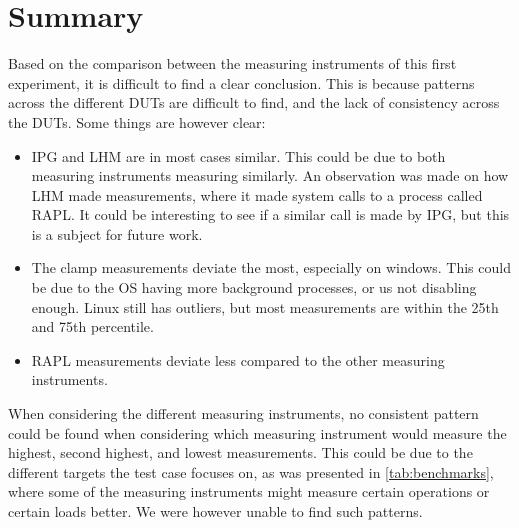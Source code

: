 \section{Summary}

Based on the comparison between the measuring instruments of this first experiment, it is difficult to find a clear conclusion. This is because patterns across the different DUTs are difficult to find, and the lack of consistency across the DUTs. Some things are however clear:

\begin{itemize}
    \item IPG and LHM are in most cases similar. This could be due to both measuring instruments measuring similarly. An observation was made on how LHM made measurements, where it made system calls to a process called RAPL. It could be interesting to see if a similar call is made by IPG, but this is a subject for future work.
    \item The clamp measurements deviate the most, especially on windows. This could be due to the OS having more background processes, or us not disabling enough. Linux still has outliers, but most measurements are within the 25th and 75th percentile.
    \item RAPL measurements deviate less compared to the other measuring instruments.
\end{itemize}

When considering the different measuring instruments, no consistent pattern could be found when considering which measuring instrument would measure the highest, second highest, and lowest measurements. This could be due to the different targets the test case focuses on, as was presented in \cref{tab:benchmarks}, where some of the measuring instruments might measure certain operations or certain loads better. We were however unable to find such patterns.

